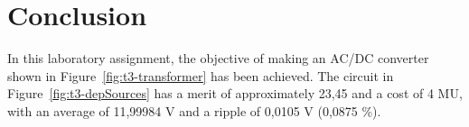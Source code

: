 \section{Conclusion}
\label{sec:conclusion}

In this laboratory assignment, the objective of making an AC/DC converter shown in
Figure~\ref{fig:t3-transformer} has been achieved.
The circuit in Figure~\ref{fig:t3-depSources} has a merit of approximately 23,45 and a cost
of 4 MU, with an average of 11,99984 V and a ripple of 0,0105 V (0,0875 \%).
